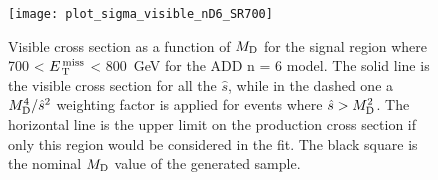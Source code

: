 \begin{figure}[!h]
  \centering
  \texttt{[image: plot\_sigma\_visible\_nD6\_SR700]}
  \caption{Visible cross section as a function of $M_\mathrm{D}$ for the signal region
    where 700 < $E_\mathrm{\, T}^\mathrm{\, miss}$ < 800~GeV for the ADD n = 6 model. The solid line is the
    visible cross section for all the $\hat{s}$, while in the dashed one a
    $M_\mathrm{D}^4/\hat{s}^2$ weighting factor is applied for events where
    $\hat{s} > M_\mathrm{D}^2$. The horizontal line is the upper limit on the production
    cross section if only this region would be considered in the fit. The black
    square is the nominal $M_\mathrm{D}$ value of the generated sample.}
  \label{fig:vis_sigma_trunc}
\end{figure}
